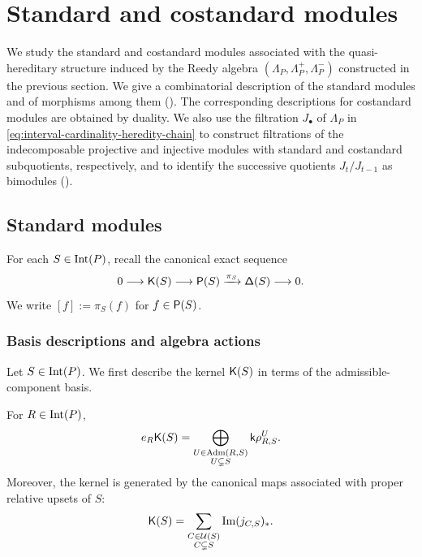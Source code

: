 \section{Standard and costandard modules}\label{sec:standards}

We study the standard and costandard modules associated with the
quasi-hereditary structure induced by the Reedy algebra
$(\Lambda_P,\Lambda_P^+,\Lambda_P^-)$ constructed in the previous section.
We give a combinatorial description of the standard modules and of morphisms among them 
().
The corresponding descriptions for costandard modules are obtained by
duality.
We also use the filtration $J_\bullet$ of $\Lambda_P$ in
\eqref{eq:interval-cardinality-heredity-chain} to construct
filtrations of the indecomposable projective and injective modules
with standard and costandard subquotients, respectively, and to identify the successive quotients $J_t/J_{t-1}$ as bimodules ().

\subsection{Standard modules}\label{sec:standard-modules}

For each
$S\in\operatorname{Int}(P)$, recall the canonical exact sequence
\begin{equation}
0
\longrightarrow
\mathsf K(S)
\longrightarrow
\mathsf P(S)
\xrightarrow{\pi_S}
\mathsf\Delta(S)
\longrightarrow
0.
\label{eq:interval-standard-defining-sequence}
\end{equation}
We write $[f]:=\pi_S(f)$ for $f\in\mathsf P(S)$.


\subsubsection{Basis descriptions and algebra actions}
\label{sec:standard-concrete}
Let $S\in \operatorname{Int}(P)$. 
We first describe the kernel $\mathsf K(S)$ in terms of the
admissible-component basis. 
\begin{lemma}
\label{lem:standard-kernel-admissible-basis}
For $R\in\operatorname{Int}(P)$, 
\begin{equation}
e_R\mathsf K(S)
=
\bigoplus_{\substack{U\in\operatorname{Adm}(R,S)\\ U\subsetneq S}}
\mathsf{k}\rho_{R,S}^{U}.
\label{eq:standard-kernel-admissible-basis}
\end{equation}
Moreover, the kernel is generated by the canonical maps associated with proper relative upsets of $S$:
\begin{equation}
\mathsf K(S)
=
\sum_{\substack{C\in\mathcal U(S)\\ C\subsetneq S}}
\operatorname{Im} (j_{C,S})_*.
\label{eq:standard-kernel-generators}
\end{equation}
\end{lemma}



